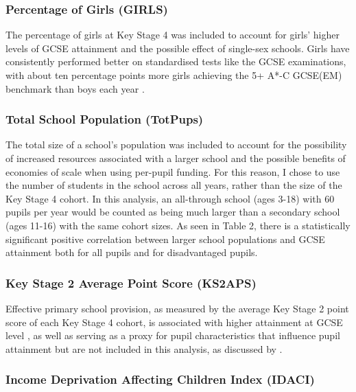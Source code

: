 \documentclass[12pt, a4paper]{article}
\begin{document}
\subsubsection{Percentage of Girls (GIRLS)}

The percentage of girls at Key Stage 4 was included to account for girls' higher levels of GCSE attainment and the possible effect of single-sex schools. Girls have consistently performed better on standardised tests like the GCSE examinations, with about ten percentage points more girls achieving the 5+ A*-C GCSE(EM) benchmark than boys each year \autocites{departmentforeducation2014b, departmentforeducation2015b, departmentforeducation2016}.

\subsubsection{Total School Population (TotPups)}

The total size of a school's population was included to account for the possibility of increased resources associated with a larger school and the possible benefits of economies of scale when using per-pupil funding. For this reason, I chose to use the number of students in the school across all years, rather than the size of the Key Stage 4 cohort. In this analysis, an all-through school (ages 3-18) with 60 pupils per year would be counted as being much larger than a secondary school (ages 11-16) with the same cohort sizes. As seen in Table 2, there is a statistically significant positive correlation between larger school populations and GCSE attainment both for all pupils and for disadvantaged pupils.

\subsubsection{Key Stage 2 Average Point Score (KS2APS)}

Effective primary school provision, as measured by the average Key Stage 2 point score of each Key Stage 4 cohort, is associated with higher attainment at GCSE level \autocites{sylva2014}, as well as serving as a proxy for pupil characteristics that influence pupil attainment but are not included in this analysis, as discussed by \textcite{sammons2014}.

\subsubsection{Income Deprivation Affecting Children Index (IDACI)}
\end{document}
